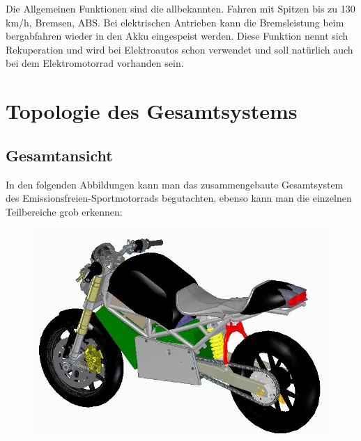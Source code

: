 Die Allgemeinen Funktionen sind die allbekannten. Fahren mit Spitzen bis zu 130 km/h, Bremsen, ABS. Bei elektrischen Antrieben kann die Bremsleistung beim bergabfahren wieder in den Akku eingespeist werden. Diese Funktion nennt sich Rekuperation und wird bei Elektroautos schon verwendet und soll natürlich auch bei dem Elektromotorrad vorhanden sein.
\newpage

\section{Topologie des Gesamtsystems}

\subsection{Gesamtansicht}

In den folgenden Abbildungen kann man das zusammengebaute Gesamtsystem des Emissionsfreien-Sportmotorrads begutachten, ebenso kann man die einzelnen Teilbereiche grob erkennen:

\begin{figure} [H]
	\begin{center}
		\includegraphics[scale=0.8] {figures/mechanik/Ducati1.jpg}
	\end{center}
\end{figure}

